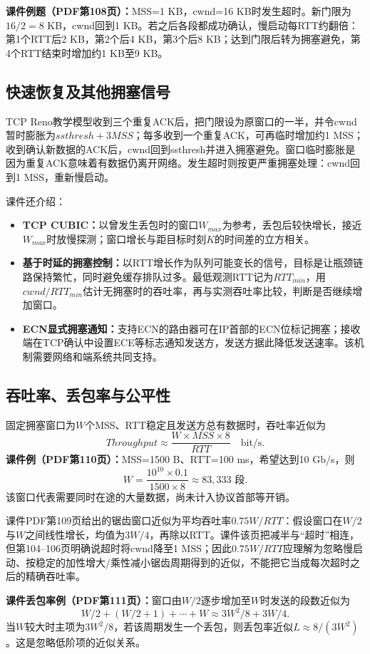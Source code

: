 \textbf{课件例题（PDF第108页）：}MSS=1 KB，cwnd=16 KB时发生超时。新门限为$16/2=8$ KB，cwnd回到1 KB。若之后各段都成功确认，慢启动每RTT约翻倍：第1个RTT后2 KB，第2个后4 KB，第3个后8 KB；达到门限后转为拥塞避免，第4个RTT结束时增加约1 KB至9 KB。

\subsection{快速恢复及其他拥塞信号}
TCP Reno教学模型收到三个重复ACK后，把门限设为原窗口的一半，并令cwnd暂时膨胀为$ssthresh+3MSS$；每多收到一个重复ACK，可再临时增加约1 MSS；收到确认新数据的ACK后，cwnd回到ssthresh并进入拥塞避免。窗口临时膨胀是因为重复ACK意味着有数据仍离开网络。发生超时则按更严重拥塞处理：cwnd回到1 MSS，重新慢启动。

课件还介绍：
\begin{itemize}[nosep]
\item \textbf{TCP CUBIC：}以曾发生丢包时的窗口$W_{max}$为参考，丢包后较快增长，接近$W_{max}$时放慢探测；窗口增长与距目标时刻$K$的时间差的立方相关。
\item \textbf{基于时延的拥塞控制：}以RTT增长作为队列可能变长的信号，目标是让瓶颈链路保持繁忙，同时避免缓存排队过多。最低观测RTT记为$RTT_{min}$，用$cwnd/RTT_{min}$估计无拥塞时的吞吐率，再与实测吞吐率比较，判断是否继续增加窗口。
\item \textbf{ECN显式拥塞通知：}支持ECN的路由器可在IP首部的ECN位标记拥塞；接收端在TCP确认中设置ECE等标志通知发送方，发送方据此降低发送速率。该机制需要网络和端系统共同支持。
\end{itemize}

\subsection{吞吐率、丢包率与公平性}
固定拥塞窗口为$W$个MSS、RTT稳定且发送方总有数据时，吞吐率近似为
\[
Throughput\approx\frac{W\times MSS\times8}{RTT}\quad\text{bit/s}.
\]
\textbf{课件例（PDF第110页）：}MSS=1500 B、RTT=100 ms，希望达到10 Gb/s，则
\[
W=\frac{10^{10}\times0.1}{1500\times8}\approx83{,}333\text{ 段}.
\]
该窗口代表需要同时在途的大量数据，尚未计入协议首部等开销。

课件PDF第109页给出的锯齿窗口近似为平均吞吐率$0.75W/RTT$：假设窗口在$W/2$与$W$之间线性增长，均值为$3W/4$，再除以RTT。课件该页把减半与“超时”相连，但第104--106页明确说超时将cwnd降至1 MSS；因此$0.75W/RTT$应理解为忽略慢启动、按稳定的加性增大/乘性减小锯齿周期得到的近似，不能把它当成每次超时之后的精确吞吐率。

\textbf{课件丢包率例（PDF第111页）：}窗口由$W/2$逐步增加至$W$时发送的段数近似为
\[
W/2+(W/2+1)+\cdots+W\approx3W^2/8+3W/4.
\]
当$W$较大时主项为$3W^2/8$，若该周期发生一个丢包，则丢包率近似$L\approx8/(3W^2)$。这是忽略低阶项的近似关系。

